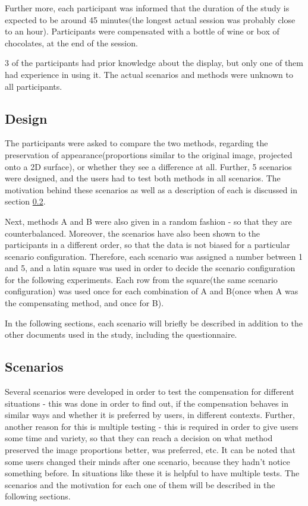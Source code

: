 \documentclass[]{article}
\begin{document}
Further more, each participant was informed that the duration of the study is expected to be around 45 minutes(the longest actual session was probably close to an hour). Participants were compensated with a bottle of wine or box of chocolates, at the end of the session.

3 of the participants had prior knowledge about the display, but only one of them had experience in using it. The actual scenarios and methods were unknown to all participants.

\subsection{Design}

The participants were asked to compare the two methods, regarding the preservation of appearance(proportions similar to the original image, projected onto a 2D surface), or whether they see a difference at all. Further, 5 scenarios were designed, and the users had to test both methods in all scenarios. The motivation behind these scenarios as well as a description of each is discussed in section \ref{sec:scenarios}.

Next, methods A and B were also given in a random fashion - so that they are counterbalanced.  Moreover, the scenarios have also been shown to the participants in a different order, so that the data is not biased for a particular scenario configuration. Therefore, each scenario was assigned a number between 1 and 5, and a latin square was used in order to decide the scenario configuration for the following experiments. Each row from the square(the same scenario configuration) was used once for each combination of A and B(once when A was the compensating method, and once for B).

In the following sections, each scenario will briefly be described in addition to the other documents used in the study, including the questionnaire.

\subsection{Scenarios}
\label{sec:scenarios}

Several scenarios were developed in order to test the compensation for different situations - this was done in order to find out, if the compensation behaves in similar ways and whether it is preferred by users, in different contexts. Further, another reason for this is multiple testing  - this is required in order to give users some time and variety, so that they can reach a decision on what method preserved the image proportions better, was preferred, etc. It can be noted that some users changed their minds after one scenario, because they hadn't notice something before. In situations like these it is helpful to have multiple tests. The scenarios and the motivation for each one of them will be described in the following sections.
\end{document}
